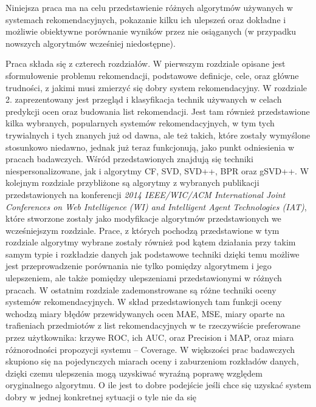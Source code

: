 \documentclass{pracamgr}
\begin{document}
  Niniejsza praca ma na celu przedstawienie różnych algorytmów używanych w systemach rekomendacyjnych, pokazanie kilku ich ulepszeń oraz
  dokładne i możliwie obiektywne porównanie wyników przez nie osiąganych (w przypadku nowszych algorytmów wcześniej niedostępne).\newline
 
  Praca składa się z czterech rozdziałów. W pierwszym rozdziale opisane jest sformułowenie problemu rekomendacji,
  podstawowe definicje, cele, oraz główne trudności, z jakimi musi zmierzyć się dobry system rekomendacyjny.
  W rozdziale 2. zaprezentowany jest przegląd i klasyfikacja technik używanych w celach predykcji ocen oraz budowania list rekomendacji.\newline
  Jest tam również przedstawione kilka wybranych, popularnych systemów rekomendacyjnych, w tym tych trywialnych
  i tych znanych już od dawna, ale też takich, które zostały wymyślone stosunkowo niedawno, jednak już teraz funkcjonują,
  jako punkt odniesienia w pracach badawczych. Wśród przedstawionych znajdują się techniki niespersonalizowane, jak i algorytmy CF, SVD, SVD++,
  BPR oraz gSVD++.\newline
  W kolejnym rozdziale przybliżone są algorytmy z wybranych publikacji przedstawionych na konferencji
  \textit{2014 IEEE/WIC/ACM International Joint Conferences on Web Intelligence (WI) and Intelligent Agent Technologies (IAT)}, 
  które stworzone zostały jako modyfikacje algorytmów przedstawionych we wcześniejszym rozdziale. Prace, z których pochodzą
  przedstawione w tym rozdziale algorytmy wybrane zostały również pod kątem działania przy takim samym typie i rozkładzie danych jak podstawowe techniki
  dzięki temu możliwe jest przeprowadzenie porównania nie tylko pomiędzy algorytmem i jego ulepszeniem, ale także pomiędzy ulepszeniami
  przedstawionymi w różnych pracach.\newline
  W ostatnim rozdziale zademonstrowane są różne techniki oceny systemów rekomendacyjnych.
  W skład przedstawionych tam funkcji oceny wchodzą miary błędów przewidywanych ocen MAE, MSE,
  miary oparte na trafieniach przedmiotów z list rekomendacyjnych w te rzeczywiście preferowane przez użytkownika:
  krzywe ROC, ich AUC, oraz Precision i MAP, oraz miara różnorodności propozycji systemu -- Coverage.
  W większości prac badawczych skupiono się na pojedynczych miarach oceny i zaburzeniom rozkładów danych,
  dzięki czemu ulepszenia mogą uzyskiwać wyraźną poprawę względem oryginalnego algorytmu.
  O ile jest to dobre podejście jeśli chce się uzyskać system dobry w jednej konkretnej sytuacji o tyle nie da się
\end{document}

